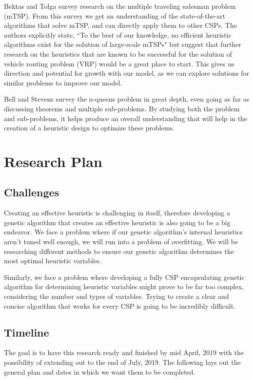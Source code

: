 \documentclass[10pt,twoside]{IEEEtran}
\begin{document}
Bektas and Tolga \cite{bektas2006multiple} survey research on the multiple traveling salesman problem (mTSP). From this survey we get an understanding of the state-of-the-art algorithms that solve mTSP, and can directly apply them to other CSPs. The authors explicitly state, ``To the best of our knowledge, no efficient heuristic algorithms exist for the solution of large-scale mTSPs" but suggest that further research on the heuristics that are known to be successful for the solution of vehicle routing problem (VRP) would be a great place to start. This gives us direction and potential for growth with our model, as we can explore solutions for similar problems to improve our model.

Bell and Stevens \cite{bell2009survey} survey the n-queens problem in great depth, even going as far as discussing theorems and multiple sub-problems. By studying both the problem and sub-problems, it helps produce an overall understanding that will help in the creation of a heuristic design to optimize these problems.


\section{Research Plan}
\subsection{Challenges}
Creating an effective heuristic is challenging in itself, therefore developing a genetic algorithm that creates an effective heuristic is also going to be a big endeavor. We face a problem where if our genetic algorithm's internal heuristics aren't tuned well enough, we will run into a problem of overfitting. We will be researching different methods to ensure our genetic algorithm determines the most optimal heuristic variables.

Similarly, we face a problem where developing a fully CSP encapsulating genetic algorithm for determining heuristic variables might prove to be far too complex, considering the number and types of variables. Trying to create a clear and concise algorithm that works for every CSP is going to be incredibly difficult.

\subsection{Timeline}
The goal is to have this research ready and finished by mid April, 2019 with the possibility of extending out to the end of July, 2019. The following lays out the general plan and dates in which we want them to be completed.
\end{document}
